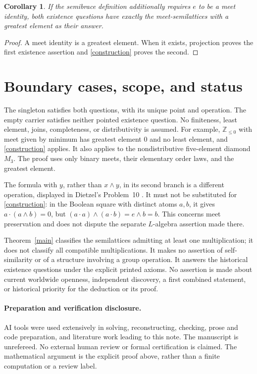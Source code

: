 \documentclass[11pt]{article}
\newtheorem{corollary}[theorem]{Corollary}
\newcommand{\meet}{\wedge}
\newcommand{\dotop}{\mathbin{\cdot}}
\begin{document}
\begin{corollary}
If the semibrace definition additionally requires \(e\) to be a meet
identity, both existence questions have exactly the meet-semilattices with
a greatest element as their answer.
\end{corollary}
\begin{proof}
A meet identity is a greatest element. When it exists, projection proves
the first existence assertion and \eqref{construction} proves the second.
\end{proof}

\section{Boundary cases, scope, and status}

The singleton satisfies both questions, with its unique point and operation.
The empty carrier satisfies neither pointed existence question.
No finiteness, least element, joins, completeness, or distributivity is
assumed. For example, \(\mathbb Z_{\leq0}\) with meet given by minimum has
greatest element \(0\) and no least element, and \eqref{construction}
applies. It also applies to the nondistributive five-element diamond
\(M_3\). The proof uses only binary meets, their elementary order laws, and
the greatest element.

The formula with \(y\), rather than \(x\meet y\), in its second branch is
a different operation, displayed in Dietzel's Problem~10
\cite[p.~546]{Dietzel}. It must not be substituted for
\eqref{construction}: in the Boolean square with distinct atoms \(a,b\),
it gives \(a\dotop(a\meet b)=0\), but
\((a\dotop a)\meet(a\dotop b)=e\meet b=b\).
This concerns meet preservation and does not dispute the separate
\(L\)-algebra assertion made there.

Theorem~\ref{main} classifies the semilattices admitting at least one
multiplication; it does not classify all compatible multiplications.
It makes no assertion of self-similarity or of a structure involving a
group operation. It answers the historical existence questions under the
explicit printed axioms. No assertion is made about current worldwide
openness, independent discovery, a first combined statement, or historical
priority for the deduction or its proof.

\paragraph{Preparation and verification disclosure.}
AI tools were used extensively in solving, reconstructing, checking,
prose and code preparation, and literature work leading to this note.
The manuscript is unrefereed. No external human review or formal
certification is claimed. The mathematical argument is the explicit
proof above, rather than a finite computation or a review label.
\end{document}

